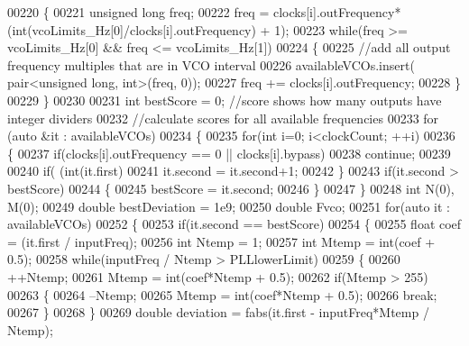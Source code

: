 \begin{DoxyCode}
{{{00220     \{
00221         \textcolor{keywordtype}{unsigned} \textcolor{keywordtype}{long} freq;
00222         freq = clocks[i].outFrequency*(int(vcoLimits\_Hz[0]/clocks[i].outFrequency) + 1);
00223         \textcolor{keywordflow}{while}(freq >= vcoLimits\_Hz[0] && freq <= vcoLimits\_Hz[1])
00224         \{
00225             \textcolor{comment}{//add all output frequency multiples that are in VCO interval}
00226             availableVCOs.insert( pair<unsigned long, int>(freq, 0));
00227             freq += clocks[i].outFrequency;
00228         \}
00229     \}
00230 
00231     \textcolor{keywordtype}{int} bestScore = 0; \textcolor{comment}{//score shows how many outputs have integer dividers}
00232     \textcolor{comment}{//calculate scores for all available frequencies}
00233     \textcolor{keywordflow}{for} (\textcolor{keyword}{auto} &it : availableVCOs)
00234     \{
00235         \textcolor{keywordflow}{for}(\textcolor{keywordtype}{int} i=0; i<clockCount; ++i)
00236         \{
00237             \textcolor{keywordflow}{if}(clocks[i].outFrequency == 0 || clocks[i].bypass)
00238                 \textcolor{keywordflow}{continue};
00239 
00240             \textcolor{keywordflow}{if}( (\textcolor{keywordtype}{int}(it.first) %
00241                 it.second = it.second+1;
00242         \}
00243         \textcolor{keywordflow}{if}(it.second > bestScore)
00244         \{
00245             bestScore = it.second;
00246         \}
00247     \}
00248     \textcolor{keywordtype}{int} N(0), M(0);
00249     \textcolor{keywordtype}{double} bestDeviation = 1e9;
00250     \textcolor{keywordtype}{double} Fvco;
00251     \textcolor{keywordflow}{for}(\textcolor{keyword}{auto} it : availableVCOs)
00252     \{
00253         \textcolor{keywordflow}{if}(it.second == bestScore)
00254         \{
00255             \textcolor{keywordtype}{float} coef = (it.first / inputFreq);
00256             \textcolor{keywordtype}{int} Ntemp = 1;
00257             \textcolor{keywordtype}{int} Mtemp = int(coef + 0.5);
00258             \textcolor{keywordflow}{while}(inputFreq / Ntemp > PLLlowerLimit)
00259             \{
00260                 ++Ntemp;
00261                 Mtemp = int(coef*Ntemp + 0.5);
00262                 \textcolor{keywordflow}{if}(Mtemp > 255)
00263                 \{
00264                     --Ntemp;
00265                     Mtemp = int(coef*Ntemp + 0.5);
00266                     \textcolor{keywordflow}{break};
00267                 \}
00268             \}
00269             \textcolor{keywordtype}{double} deviation = fabs(it.first - inputFreq*Mtemp / Ntemp);
}}}
\end{DoxyCode}
